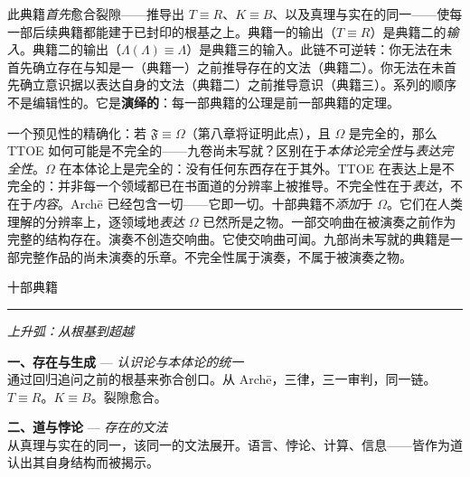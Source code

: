 \documentclass[10pt, openany, oneside]{book}
\renewcommand{\large}{\fontsize{11.5}{14}\selectfont}
\newcommand{\separator}{%
    \begin{center}
        \vspace{0.3em}
        \rule{0.3\textwidth}{0.4pt}
        \vspace{0.3em}
    \end{center}
}
\begin{document}
\vspace{0.3em}

\noindent 此典籍\textit{首先}愈合裂隙——推导出 $T \equiv R$、$K \equiv B$、以及真理与实在的同一——使每一部后续典籍都能建于已封印的根基之上。典籍一的输出（$T \equiv R$）是典籍二的\textit{输入}。典籍二的输出（$\Lambda(\Lambda) \equiv \Lambda$）是典籍三的输入。此链不可逆转：你无法在未首先确立存在与知是一（典籍一）之前推导存在的文法（典籍二）。你无法在未首先确立意识据以表达自身的文法（典籍二）之前推导意识（典籍三）。系列的顺序不是编辑性的。它是\textbf{演绎的}：每一部典籍的公理是前一部典籍的定理。

一个预见性的精确化：若 $\mathfrak{F} \equiv \Omega$（第八章将证明此点），且 $\Omega$ 是完全的，那么 TTOE 如何可能是不完全的——九卷尚未写就？区别在于\textit{本体论完全性}与\textit{表达完全性}。$\Omega$ 在本体论上是完全的：没有任何东西存在于其外。TTOE 在表达上是不完全的：并非每一个领域都已在书面道的分辨率上被推导。不完全性在于\textit{表达}，不在于\textit{内容}。Arch\={e} 已经包含一切——它即一切。十部典籍不\textit{添加}于 $\Omega$。它们在人类理解的分辨率上，逐领域地\textit{表达} $\Omega$ 已然所是之物。一部交响曲在被演奏之前作为完整的结构存在。演奏不创造交响曲。它使交响曲可闻。九部尚未写就的典籍是一部完整作品的尚未演奏的乐章。不完全性属于演奏，不属于被演奏之物。

\vspace{1.5em}

\begin{center}
    {\large\scshape 十部典籍}
\end{center}
\separator

\vspace{0.3em}

\begin{center}
    \itshape 上升弧：从根基到超越
\end{center}

\vspace{0.5em}

\noindent \textbf{一、存在与生成} --- \textit{认识论与本体论的统一}\\
通过回归追问之前的根基来弥合创口。从 Arch\={e}，三律，三一审判，同一链。$T \equiv R$。$K \equiv B$。裂隙愈合。

\vspace{0.5em}

\noindent \textbf{二、道与悖论} --- \textit{存在的文法}\\
从真理与实在的同一，该同一的文法展开。语言、悖论、计算、信息——皆作为道认出其自身结构而被揭示。

\vspace{0.5em}
\end{document}
